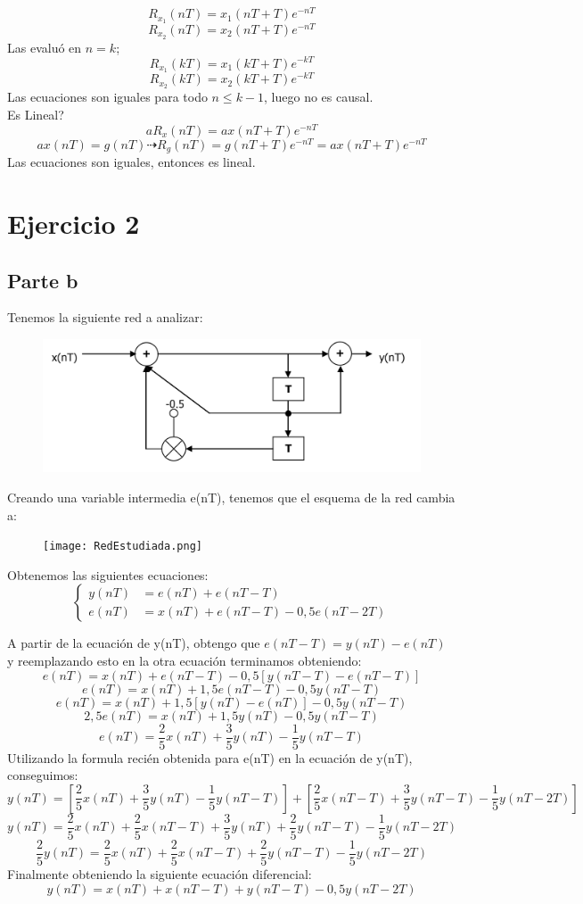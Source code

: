 \documentclass{report}
\begin{document}
$$R_{x_{1}}(nT) = x_1(nT+T)e^{-nT}$$
$$R_{x_{2}}(nT) = x_2(nT+T)e^{-nT}$$
Las evalu\'o en $n=k$;\\
$$R_{x_{1}}(kT) = x_1(kT+T)e^{-kT}$$
$$R_{x_{2}}(kT) = x_2(kT+T)e^{-kT}$$
Las ecuaciones son iguales para todo $n\leq k-1$, luego no es causal.\\
Es Lineal?\\
$$aR_x(nT) = ax(nT+T)e^{-nT}$$
$$ax(nT)=g(nT)\dashrightarrow R_g(nT) = g(nT+T)e^{-nT} = ax(nT+T)e^{-nT} $$
Las ecuaciones son iguales, entonces es lineal.\\

\chapter*{Ejercicio 2}

\section{Parte b}
Tenemos la siguiente red a analizar:
\begin{figure}[H]
    \centering
    \includegraphics[width = .5\textwidth]{Red.png}
    \label{fig:Red}
\end{figure}
Creando una variable intermedia e(nT), tenemos que el esquema de la red cambia a:
\begin{figure}[H]
    \centering
    \texttt{[image: RedEstudiada.png]}
    \label{fig:Red}
\end{figure}
Obtenemos las siguientes ecuaciones:\\
\begin{equation*}
\left\{
\begin{aligned}
y(nT) & = e(nT) + e(nT-T) \\
e(nT) & = x(nT) + e(nT-T) -0,5 e(nT-2T)
\end{aligned}
\right.
\end{equation*}

A partir de la ecuaci\'on de y(nT), obtengo que $e(nT-T)=y(nT)-e(nT)$ y reemplazando esto en la otra ecuaci\'on terminamos obteniendo:
$$e(nT)= x(nT) + e(nT-T) -0,5 [y(nT-T)-e(nT-T)]$$
$$e(nT)= x(nT) + 1,5e(nT-T) -0,5y(nT-T)$$
$$e(nT)= x(nT) + 1,5[y(nT)-e(nT)] -0,5y(nT-T)$$
$$2,5e(nT)= x(nT) + 1,5y(nT) -0,5y(nT-T)$$
$$e(nT)= \frac{2}{5} x(nT) + \frac{3}{5}y(nT) -\frac{1}{5}y(nT-T)$$
Utilizando la formula reci\'en obtenida para e(nT) en la ecuaci\'on de y(nT), conseguimos:
$$y(nT) = \left[ \frac{2}{5} x(nT) + \frac{3}{5}y(nT) -\frac{1}{5} y(nT-T)\right] + \left[ \frac{2}{5} x(nT-T) + \frac{3}{5} y(nT-T) -\frac{1}{5} y(nT-2T)\right]$$
$$y(nT) =  \frac{2}{5} x(nT)  + \frac{2}{5} x(nT-T) + \frac{3}{5}y(nT) + \frac{2}{5} y(nT-T) -\frac{1}{5} y(nT-2T)$$
$$\frac{2}{5}y(nT) =  \frac{2}{5} x(nT)  + \frac{2}{5} x(nT-T) + \frac{2}{5} y(nT-T) -\frac{1}{5} y(nT-2T)$$
Finalmente obteniendo la siguiente ecuación diferencial:
$$y(nT) =  x(nT)  + x(nT-T) + y(nT-T) -0,5 y(nT-2T)$$



\end{document}
